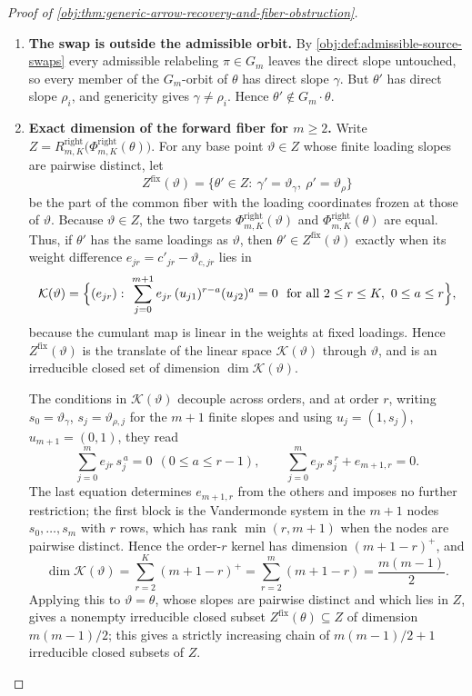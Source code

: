 \begin{proof}[Proof of \cref{obj:thm:generic-arrow-recovery-and-fiber-obstruction}]
\begin{enumerate}
\item \textbf{The swap is outside the admissible orbit.}  By \cref{obj:def:admissible-source-swaps} every admissible relabeling \(\pi\in G_m\) leaves the direct slope untouched, so every member of the \(G_m\)-orbit of \(\theta\) has direct slope \(\gamma\).  But \(\theta'\) has direct slope \(\rho_i\), and genericity gives \(\gamma\ne\rho_i\).  Hence \(\theta'\notin G_m\cdot\theta\).

\item \textbf{Exact dimension of the forward fiber for \(m\ge2\).}  Write \(Z=R^{\mathrm{right}}_{m,K}\bigl(\Phi^{\mathrm{right}}_{m,K}(\theta)\bigr)\).  For any base point \(\vartheta\in Z\) whose finite loading slopes are pairwise distinct, let
\[
Z^{\mathrm{fix}}(\vartheta)=\{\theta'\in Z:\ \gamma'=\vartheta_\gamma,\ \rho'=\vartheta_\rho\}
\]
be the part of the common fiber with the loading coordinates frozen at those of \(\vartheta\).  Because \(\vartheta\in Z\), the two targets \(\Phi^{\mathrm{right}}_{m,K}(\vartheta)\) and \(\Phi^{\mathrm{right}}_{m,K}(\theta)\) are equal.  Thus, if \(\theta'\) has the same loadings as \(\vartheta\), then \(\theta'\in Z^{\mathrm{fix}}(\vartheta)\) exactly when its weight difference \(e_{jr}=c'_{jr}-\vartheta_{c,jr}\) lies in
\[
\mathcal K(\vartheta)=\Bigl\{(e_{jr}):\ \sum_{j=0}^{m+1}e_{jr}\,(u_{j1})^{r-a}(u_{j2})^{a}=0
\ \ \text{for all }2\le r\le K,\ 0\le a\le r\Bigr\},
\]
because the cumulant map is linear in the weights at fixed loadings.  Hence \(Z^{\mathrm{fix}}(\vartheta)\) is the translate of the linear space \(\mathcal K(\vartheta)\) through \(\vartheta\), and is an irreducible closed set of dimension \(\dim\mathcal K(\vartheta)\).

The conditions in \(\mathcal K(\vartheta)\) decouple across orders, and at order \(r\), writing \(s_0=\vartheta_\gamma\), \(s_j=\vartheta_{\rho,j}\) for the \(m+1\) finite slopes and using \(u_j=(1,s_j)\), \(u_{m+1}=(0,1)\), they read
\[
\sum_{j=0}^{m}e_{jr}\,s_j^{\,a}=0\ \ (0\le a\le r-1),
\qquad
\sum_{j=0}^{m}e_{jr}\,s_j^{\,r}+e_{m+1,r}=0 .
\]
The last equation determines \(e_{m+1,r}\) from the others and imposes no further restriction; the first block is the Vandermonde system in the \(m+1\) nodes \(s_0,\ldots,s_m\) with \(r\) rows, which has rank \(\min(r,m+1)\) when the nodes are pairwise distinct.  Hence the order-\(r\) kernel has dimension \((m+1-r)^{+}\), and
\[
\dim\mathcal K(\vartheta)=\sum_{r=2}^{K}(m+1-r)^{+}=\sum_{r=2}^{m}(m+1-r)=\frac{m(m-1)}2 .
\]
Applying this to \(\vartheta=\theta\), whose slopes are pairwise distinct and which lies in \(Z\), gives a nonempty irreducible closed subset \(Z^{\mathrm{fix}}(\theta)\subseteq Z\) of dimension \(m(m-1)/2\); this gives a strictly increasing chain of \(m(m-1)/2+1\) irreducible closed subsets of \(Z\).


\end{enumerate}
\end{proof}
